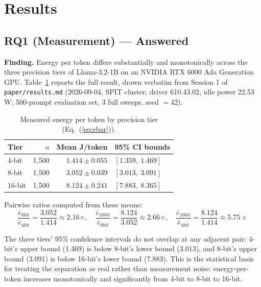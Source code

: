 \documentclass[conference]{IEEEtran}
\begin{document}
\section{Results}
\label{sec:results}

\subsection{RQ1 (Measurement) --- Answered}
\label{sec:rq1}

\textbf{Finding.} Energy per token differs substantially and
monotonically across the three precision tiers of Llama-3.2-1B on an
NVIDIA RTX 6000 Ada Generation GPU. Table~\ref{tab:energy} reports the
full result, drawn verbatim from Session 1 of \texttt{paper/results.md}
(2026-09-04, SPIT cluster; driver 610.43.02, idle power 22.53\,W;
500-prompt evaluation set, 3 full sweeps, seed $=42$).

\begin{table}[h]
\caption{Measured energy per token by precision tier (Eq.~(\ref{eq:ebar})).}
\label{tab:energy}
\centering
\begin{tabular}{@{}lrrl@{}}
\toprule
Tier & $n$ & Mean J/token & 95\% CI bounds \\
\midrule
4-bit  & 1,500 & $1.414 \pm 0.055$ & $[1.359,\ 1.469]$ \\
8-bit  & 1,500 & $3.052 \pm 0.039$ & $[3.013,\ 3.091]$ \\
16-bit & 1,500 & $8.124 \pm 0.241$ & $[7.883,\ 8.365]$ \\
\bottomrule
\end{tabular}
\end{table}

Pairwise ratios computed from these means:
\begin{equation}
\frac{\bar{e}_{8bit}}{\bar{e}_{4bit}} = \frac{3.052}{1.414} \approx 2.16\times,\quad
\frac{\bar{e}_{16bit}}{\bar{e}_{8bit}} = \frac{8.124}{3.052} \approx 2.66\times,\quad
\frac{\bar{e}_{16bit}}{\bar{e}_{4bit}} = \frac{8.124}{1.414} \approx 5.75\times
\label{eq:ratios}
\end{equation}

The three tiers' 95\% confidence intervals do not overlap at any adjacent
pair: 4-bit's upper bound (1.469) is below 8-bit's lower bound (3.013),
and 8-bit's upper bound (3.091) is below 16-bit's lower bound (7.883).
This is the statistical basis for treating the separation as real rather
than measurement noise: energy-per-token increases monotonically and
significantly from 4-bit to 8-bit to 16-bit.
\end{document}
